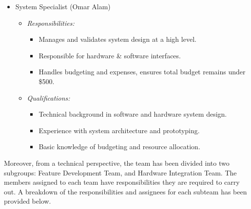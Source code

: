 \documentclass{article}
\begin{document}
\begin{itemize}
\begin{itemize}
    \end{itemize}
  \item System Specialist (Omar Alam)
    \begin{itemize}
      \item \textit{Responsibilities:}
        \begin{itemize}
          \item Manages and validates system design at a high level. 
          \item Responsible for hardware \& software interfaces.
          \item Handles budgeting and expenses, ensures total budget remains
          under \$500.
        \end{itemize}
      \item \textit{Qualifications:}
        \begin{itemize}
          \item Technical background in software and hardware system design. 
          \item Experience with system architecture and prototyping.  
          \item Basic knowledge of budgeting and resource allocation. 
        \end{itemize}
    \end{itemize}
\end{itemize}

Moreover, from a technical perspective, the team has been divided into two 
subgroups: Feature Development Team, and Hardware Integration Team. The members 
assigned to each team have responsibilities they are required to carry out. 
A breakdown of the responsibilities and assignees for each subteam has been 
provided below. 
\end{document}
